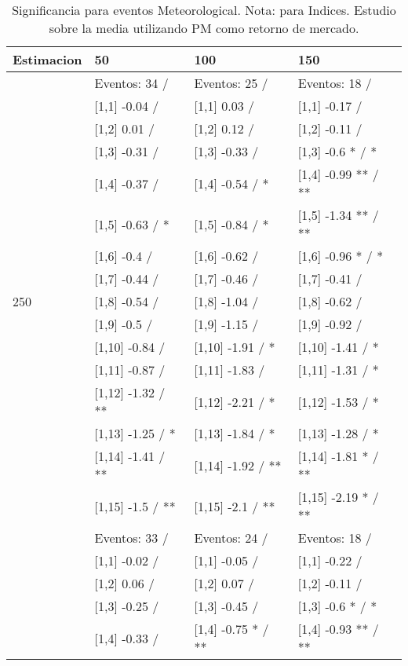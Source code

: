 \begin{table}

\caption{Significancia para eventos Meteorological. Nota: para Indices. Estudio sobre la media utilizando PM como retorno de mercado.}
\centering
\begin{tabular}[t]{llll}
\toprule
Estimacion & 50 & 100 & 150\\
\midrule
 & Eventos:  34 / & Eventos:  25 / & Eventos:  18 /\\
 & {}[1,1] -0.04  / & {}[1,1] 0.03  / & {}[1,1] -0.17  /\\
 & {}[1,2] 0.01  / & {}[1,2] 0.12  / & {}[1,2] -0.11  /\\
 & {}[1,3] -0.31  / & {}[1,3] -0.33  / & {}[1,3] -0.6 * / *\\
 & {}[1,4] -0.37  / & {}[1,4] -0.54  / * & {}[1,4] -0.99 ** / **\\
\addlinespace
 & {}[1,5] -0.63  / * & {}[1,5] -0.84  / * & {}[1,5] -1.34 ** / **\\
 & {}[1,6] -0.4  / & {}[1,6] -0.62  / & {}[1,6] -0.96 * / *\\
 & {}[1,7] -0.44  / & {}[1,7] -0.46  / & {}[1,7] -0.41  /\\
250 & {}[1,8] -0.54  / & {}[1,8] -1.04  / & {}[1,8] -0.62  /\\
 & {}[1,9] -0.5  / & {}[1,9] -1.15  / & {}[1,9] -0.92  /\\
\addlinespace
 & {}[1,10] -0.84  / & {}[1,10] -1.91  / * & {}[1,10] -1.41  / *\\
 & {}[1,11] -0.87  / & {}[1,11] -1.83  / & {}[1,11] -1.31  / *\\
 & {}[1,12] -1.32  / ** & {}[1,12] -2.21  / * & {}[1,12] -1.53  / *\\
 & {}[1,13] -1.25  / * & {}[1,13] -1.84  / * & {}[1,13] -1.28  / *\\
 & {}[1,14] -1.41  / ** & {}[1,14] -1.92  / ** & {}[1,14] -1.81 * / **\\
\addlinespace
 & {}[1,15] -1.5  / ** & {}[1,15] -2.1  / ** & {}[1,15] -2.19 * / **\\
 & Eventos:  33 / & Eventos:  24 / & Eventos:  18 /\\
 & {}[1,1] -0.02  / & {}[1,1] -0.05  / & {}[1,1] -0.22  /\\
 & {}[1,2] 0.06  / & {}[1,2] 0.07  / & {}[1,2] -0.11  /\\
 & {}[1,3] -0.25  / & {}[1,3] -0.45  / & {}[1,3] -0.6 * / *\\
\addlinespace
 & {}[1,4] -0.33  / & {}[1,4] -0.75 * / ** & {}[1,4] -0.93 ** / **\\

\end{tabular}
\end{table}
